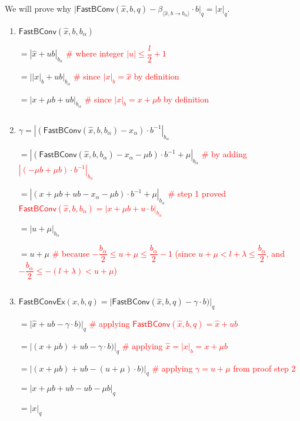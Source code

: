 We will prove why $\Big|\textsf{FastBConv}(\hat{x}, b, q) - \beta_{\langle \hat{x}, b\rightarrow b_\alpha \rangle} \cdot b\Big|_q = |x|_q$. 

\begin{myproof}



\begin{enumerate}



\item $\textsf{FastBConv}(\hat{x}, b, b_\alpha) $%

$ = |\hat{x} + ub|_{b_\alpha}$ \textcolor{red}{ \# where integer $|u| \leq \dfrac{l}{2}+1$}

$ = \Big||x|_{b} + ub\Big|_{b_\alpha}$ \textcolor{red}{ \# since $|x|_{b} = \hat{x}$ by definition}

$ = |x + \mu b + ub|_{b_\alpha}$ \textcolor{red}{ \# since $|x|_{b} = x + \mu b$ by definition}

$ $

\item $\gamma = |(\textsf{FastBConv}(\hat{x}, b, b_\alpha) - x_\alpha)\cdot b^{-1}|_{b_\alpha}$

$ = |(\textsf{FastBConv}(\hat{x}, b, b_\alpha) - x_\alpha - \mu b)\cdot b^{-1} + \mu|_{b_\alpha} $ \textcolor{red}{ \# by adding $|(-\mu b + \mu b)\cdot b^{-1}|_{b_\alpha}$}

$ = |(x + \mu b + ub - x_\alpha - \mu b)\cdot b^{-1} + \mu|_{b_\alpha} $ \textcolor{red}{ \# step 1 proved $ \textsf{FastBConv}(\hat{x}, b, b_\alpha) = |x + \mu b + u\cdot b|_{b_\alpha}$}

$ = |u + \mu|_{b_\alpha} $

$ = u + \mu $ \textcolor{red}{ \# because $-\dfrac{b_\alpha}{2} \leq u + \mu \leq \dfrac{b_\alpha}{2} - 1$ (since $u + \mu < l + \lambda \leq \dfrac{b_\alpha}{2}$, and $-\dfrac{b_\alpha}{2} \leq -(l+\lambda) < u + \mu$)}

$ $

\item $\textsf{FastBConvEx}(x, b, q) = \Big|\textsf{FastBConv}(\hat{x}, b, q) - \gamma \cdot b)\Big|_q $

$ = \Big|\hat{x} + u b - \gamma \cdot b)\Big|_q $ \textcolor{red}{ \# applying $\textsf{FastBConv}(\hat{x}, b, q) = \hat{x} + u b$ }

$ = \Big|(x + \mu b) + u b - \gamma \cdot b)\Big|_q $ \textcolor{red}{ \# applying $\hat{x} = |x|_b = x + \mu b$}

$ = \Big|(x + \mu b) + u b - (u + \mu) \cdot b)\Big|_q $ \textcolor{red}{ \# applying $\gamma = u + \mu$ from proof step 2}

$ = |x + \mu b + ub - ub - \mu b|_q $

$ = |x|_q $

\end{enumerate}

\end{myproof}

